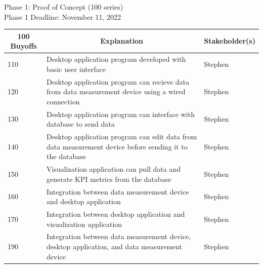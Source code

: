 \documentclass[12pt]{article}
\begin{document}
\noindent
Phase 1: Proof of Concept (100 series)\\
Phase 1 Deadline: November 11, 2022\\
\begin{table}[H]
  \centering
  \begin{tabular}{|p{2cm}|p{10cm}|p{2cm}|}
  \hline
  \multicolumn{1}{|c|}{\textbf{100 Buyoffs}} & \multicolumn{1}{c|}{\textbf{Explanation}} & \multicolumn{1}{|c|}{\textbf{Stakeholder(s)}}
  \\ \hline
  110
  & Desktop application program developed with basic user interface
  & Stephen
  \newline                                
  
  \\ \hline
  120                              
  & Desktop application program can recieve data from data measurement device using a wired connection
  & Stephen
  \newline                                

  \\ \hline
  130                          
  & Desktop application program can interface with database to send data
  & Stephen
  \newline                                

  \\ \hline
  140                                
  & Desktop application program can edit data from data measurement device before sending it to the database
  & Stephen 
  \newline                            

    \\ \hline
  150                                
  & Visualization application can pull data and generate KPI metrics from the database
  & Stephen 
  \newline 

  \\ \hline
  160                                
  & Integration between data measurement device and desktop application
  & Stephen 
  \newline 

  \\ \hline
  170                                
  & Integration between desktop application and visualization application
  & Stephen 
  \newline 

  \\ \hline
  190                                
  & Integration between data measurement device, desktop application, and data measurement device
  & Stephen 
  \newline 
  \\ \hline


  \end{tabular}
\end{table}
\end{document}
